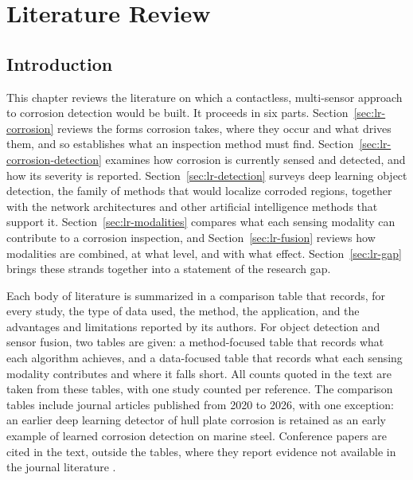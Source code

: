 \providecommand{\cmY}{$\checkmark$}
\providecommand{\cmN}{$\times$}
\chapter[LITERATURE REVIEW]{Literature Review}
\label{ch:literature-review}

\section{Introduction}
\label{sec:lr-introduction}

This chapter reviews the literature on which a contactless, multi-sensor
approach to corrosion detection would be built. It proceeds in six parts.
Section~\ref{sec:lr-corrosion} reviews the forms corrosion takes, where they
occur and what drives them, and so establishes what an inspection method must
find. Section~\ref{sec:lr-corrosion-detection} examines how corrosion is
currently sensed and detected, and how its severity is reported.
Section~\ref{sec:lr-detection} surveys deep learning object detection, the
family of methods that would localize corroded regions, together with the
network architectures and other artificial intelligence methods that support it.
Section~\ref{sec:lr-modalities} compares what each sensing modality can
contribute to a corrosion inspection, and Section~\ref{sec:lr-fusion} reviews
how modalities are combined, at what level, and with what effect.
Section~\ref{sec:lr-gap} brings these strands together into a statement of the
research gap.

Each body of literature is summarized in a comparison table that records, for
every study, the type of data used, the method, the application, and the
advantages and limitations reported by its authors. For object detection and
sensor fusion, two tables are given: a method-focused table that records what
each algorithm achieves, and a data-focused table that records what each sensing
modality contributes and where it falls short. All counts quoted in the text are
taken from these tables, with one study counted per reference. The comparison
tables include journal articles published from 2020 to 2026, with one exception:
an earlier deep learning detector of hull plate corrosion \citep{Yao2019} is retained as
an early example of learned corrosion detection on marine steel. Conference papers are cited in the text, outside
the tables, where they report evidence not available in the journal literature
\citep{Soares2023,Ding2025,Zheng2025,Haitz2022,Mota2024}.

